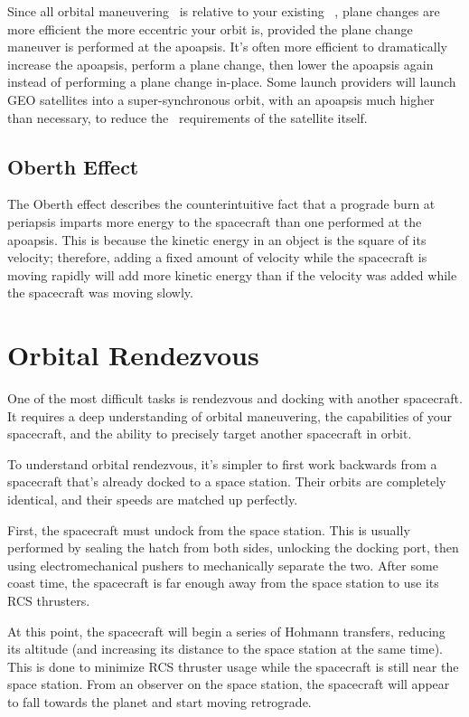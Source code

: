 Since all orbital maneuvering \dv\ is relative to your existing \dv\ ,
plane changes are more efficient the more eccentric your orbit is,
provided the plane change maneuver is performed at the apoapsis. It's
often more efficient to dramatically increase the apoapsis, perform a
plane change, then lower the apoapsis again instead of performing a
plane change in-place. Some launch providers will launch GEO
satellites into a super-synchronous orbit, with an apoapsis much
higher than necessary, to reduce the \dv\ requirements of the satellite
itself.

\subsection{Oberth Effect}

The Oberth effect describes the counterintuitive fact that a prograde
burn at periapsis imparts more energy to the spacecraft than one
performed at the apoapsis. This is because the kinetic energy in an
object is the square of its velocity; therefore, adding a fixed amount
of velocity while the spacecraft is moving rapidly will add more
kinetic energy than if the velocity was added while the spacecraft was
moving slowly.

\section{Orbital Rendezvous}

One of the most difficult tasks is rendezvous and docking with another
spacecraft. It requires a deep understanding of orbital maneuvering,
the capabilities of your spacecraft, and the ability to precisely
target another spacecraft in orbit.

To understand orbital rendezvous, it's simpler to first work backwards
from a spacecraft that's already docked to a space station. Their
orbits are completely identical, and their speeds are matched up
perfectly.

First, the spacecraft must undock from the space station. This is
usually performed by sealing the hatch from both sides, unlocking the
docking port, then using electromechanical pushers to mechanically
separate the two. After some coast time, the spacecraft is far enough
away from the space station to use its RCS thrusters.

At this point, the spacecraft will begin a series of Hohmann
transfers, reducing its altitude (and increasing its distance to the
space station at the same time). This is done to minimize RCS thruster
usage while the spacecraft is still near the space station. From an
observer on the space station, the spacecraft will appear to fall
towards the planet and start moving retrograde.

